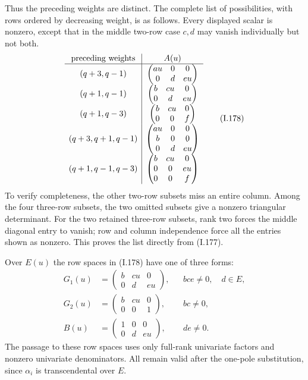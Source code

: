 Thus the preceding weights are distinct. The complete list
of possibilities, with rows ordered by decreasing weight,
is as follows. Every displayed scalar is nonzero, except
that in the middle two-row case $c,d$ may vanish individually
but not both.
\[
\begin{array}{c|c}
 \hbox{preceding weights}&A(u)\\ \hline
 (q+3,q-1)&
 \begin{pmatrix}a u&0&0\\0&d&e u\end{pmatrix}\\[3pt]
 (q+1,q-1)&
 \begin{pmatrix}b&c u&0\\0&d&e u\end{pmatrix}\\[3pt]
 (q+1,q-3)&
 \begin{pmatrix}b&c u&0\\0&0&f\end{pmatrix}\\[3pt]
 (q+3,q+1,q-1)&
 \begin{pmatrix}a u&0&0\\b&0&0\\0&d&e u\end{pmatrix}\\[3pt]
 (q+1,q-1,q-3)&
 \begin{pmatrix}b&c u&0\\0&0&e u\\0&0&f\end{pmatrix}
\end{array}
 \tag{I.178}
\]
To verify completeness, the other two-row subsets miss an
entire column. Among the four three-row subsets, the two
omitted subsets give a nonzero triangular determinant.
For the two retained three-row subsets, rank two forces
the middle diagonal entry to vanish; row and column
independence force all the entries shown as nonzero.
This proves the list directly from (I.177).

Over $E(u)$ the row spaces in (I.178) have one of three
forms:
\[
\begin{aligned}
 G_1(u)&=\begin{pmatrix}b&c u&0\\0&d&e u\end{pmatrix},
       &&bce\ne0,\quad d\in E,\\
 G_2(u)&=\begin{pmatrix}b&c u&0\\0&0&1\end{pmatrix},
       &&bc\ne0,\\
 B(u)&=\begin{pmatrix}1&0&0\\0&d&e u\end{pmatrix},
       &&de\ne0.
\end{aligned}
 \tag{I.179}
\]
The passage to these row spaces uses only full-rank
univariate factors and nonzero univariate denominators.
All remain valid after the one-pole substitution, since
$\alpha_i$ is transcendental over $E$.

